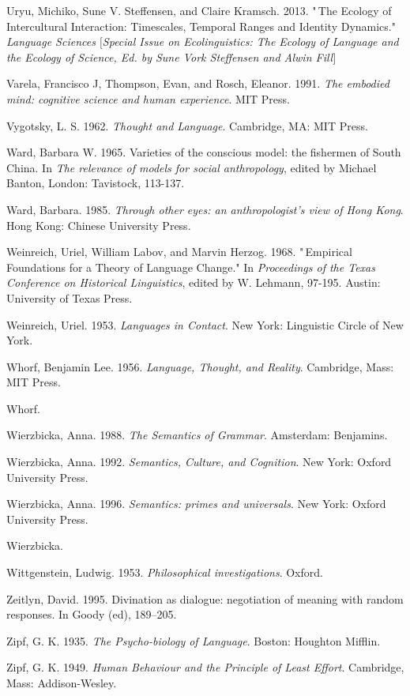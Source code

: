 Uryu, Michiko, Sune V. Steffensen, and Claire Kramsch. 2013. "\,The 
Ecology of Intercultural Interaction: Timescales, Temporal Ranges and 
Identity Dynamics." \textit{Language Sciences $[$Special Issue on 
Ecolinguistics: The Ecology of Language and the Ecology of Science, Ed. 
by Sune Vork Steffensen and Alwin Fill$]$}

Varela, Francisco J, Thompson, Evan, and Rosch, Eleanor. 1991. \textit{
The embodied mind: cognitive science and human experience}. MIT Press.

Vygotsky, L. S. 1962. \textit{Thought and Language}. Cambridge, MA: 
MIT Press.

Ward, Barbara W. 1965. Varieties of the conscious model: the fishermen 
of South China. In \textit{The relevance of models for social 
anthropology}, edited by Michael Banton, London: Tavistock, 113-137.

Ward, Barbara. 1985. \textit{Through other eyes: an anthropologist's 
view of Hong Kong}. Hong Kong: Chinese University Press.

Weinreich, Uriel, William Labov, and Marvin Herzog. 1968. "\,Empirical 
Foundations for a Theory of Language Change." In \textit{Proceedings of 
the Texas Conference on Historical Linguistics}, edited by W. Lehmann, 
97-195. Austin: University of Texas Press.

Weinreich, Uriel. 1953. \textit{Languages in Contact}. New York: 
Linguistic Circle of New York.

Whorf, Benjamin Lee. 1956. \textit{Language, Thought, and Reality}. 
Cambridge, Mass: MIT Press.

Whorf.

Wierzbicka, Anna. 1988. \textit{The Semantics of Grammar}. Amsterdam: 
Benjamins.

Wierzbicka, Anna. 1992. \textit{Semantics, Culture, and Cognition}. 
New York: Oxford University Press.

Wierzbicka, Anna. 1996. \textit{Semantics: primes and universals}. 
New York: Oxford University Press.

Wierzbicka.

Wittgenstein, Ludwig. 1953. \textit{Philosophical investigations}. 
Oxford.

Zeitlyn, David. 1995. Divination as dialogue: negotiation of meaning 
with random responses. In Goody (ed), 189--205.

Zipf, G. K. 1935. \textit{The Psycho-biology of Language}. Boston: 
Houghton Mifflin.

Zipf, G. K. 1949. \textit{Human Behaviour and the Principle of Least 
Effort}. Cambridge, Mass: Addison-Wesley.





